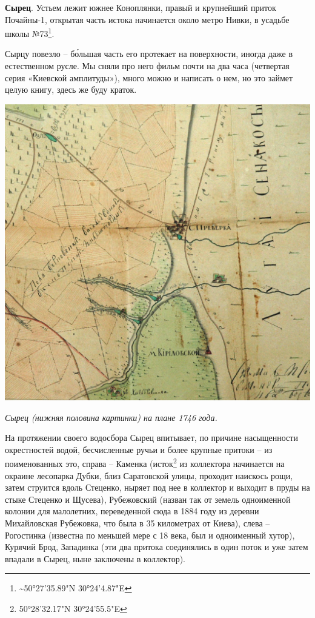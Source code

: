 \textbf{Сырец}. Устьем лежит южнее Коноплянки, правый и крупнейший приток Почайны-1, открытая часть истока начинается около метро Нивки, в усадьбе школы №73\footnote{\textasciitilde{}50°27'35.89"N  30°24'4.87"E}.

Сырцу повезло – б\'ольшая часть его протекает на поверхности, иногда даже в естественном русле. Мы сняли про него фильм почти на два часа (четвертая серия «Киевской амплитуды»), много можно и написать о нем, но это займет целую книгу, здесь же буду краток.

\begin{center}
\includegraphics[width=\linewidth]{chast-colebanie-osnov/pochayna/1746-syrec.jpg}

\textit{Сырец (нижняя половина картинки) на плане 1746 года.}
\end{center}

На протяжении своего водосбора Сырец впитывает, по причине насыщенности окрестностей водой, бесчисленные ручьи и более крупные притоки – из поименованных это, справа – Каменка (исток\footnote{50°28'32.17"N 30°24'55.5"E} из коллектора начинается на окраине лесопарка Дубки, близ Саратовской улицы, проходит наискось рощи, затем струится вдоль Стеценко, ныряет под нее в коллектор и выходит в пруды на стыке Стеценко и Щусева), Рубежовский (назван так от земель одноименной колонии для малолетних, переведенной сюда в 1884 году из деревни Михайловская Рубежовка, что была в 35 километрах от Киева), слева – Рогостинка (известна по меньшей мере с 18 века, был и одноименный хутор), Курячий Брод, Западинка (эти два притока соединялись в один поток и уже затем впадали в Сырец, ныне заключены в коллектор). 

